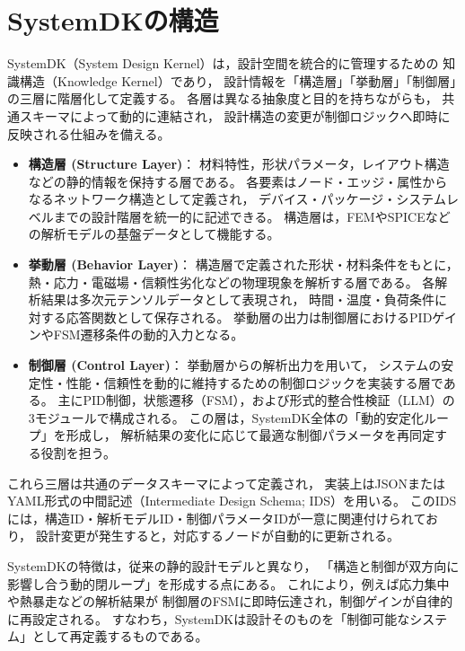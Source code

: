 \section{SystemDKの構造}

SystemDK（System Design Kernel）は，設計空間を統合的に管理するための
知識構造（Knowledge Kernel）であり，
設計情報を「構造層」「挙動層」「制御層」の三層に階層化して定義する。
各層は異なる抽象度と目的を持ちながらも，
共通スキーマによって動的に連結され，
設計構造の変更が制御ロジックへ即時に反映される仕組みを備える。

\begin{itemize}
  \item \textbf{構造層 (Structure Layer)}：  
  材料特性，形状パラメータ，レイアウト構造などの静的情報を保持する層である。  
  各要素はノード・エッジ・属性からなるネットワーク構造として定義され，
  デバイス・パッケージ・システムレベルまでの設計階層を統一的に記述できる。  
  構造層は，FEMやSPICEなどの解析モデルの基盤データとして機能する。
  
  \item \textbf{挙動層 (Behavior Layer)}：  
  構造層で定義された形状・材料条件をもとに，
  熱・応力・電磁場・信頼性劣化などの物理現象を解析する層である。  
  各解析結果は多次元テンソルデータとして表現され，
  時間・温度・負荷条件に対する応答関数として保存される。  
  挙動層の出力は制御層におけるPIDゲインやFSM遷移条件の動的入力となる。
  
  \item \textbf{制御層 (Control Layer)}：  
  挙動層からの解析出力を用いて，
  システムの安定性・性能・信頼性を動的に維持するための制御ロジックを実装する層である。  
  主にPID制御，状態遷移（FSM），および形式的整合性検証（LLM）の3モジュールで構成される。  
  この層は，SystemDK全体の「動的安定化ループ」を形成し，
  解析結果の変化に応じて最適な制御パラメータを再同定する役割を担う。
\end{itemize}

これら三層は共通のデータスキーマによって定義され，
実装上はJSONまたはYAML形式の中間記述（Intermediate Design Schema; IDS）を用いる。
このIDSには，構造ID・解析モデルID・制御パラメータIDが一意に関連付けられており，
設計変更が発生すると，対応するノードが自動的に更新される。

SystemDKの特徴は，従来の静的設計モデルと異なり，
「構造と制御が双方向に影響し合う動的閉ループ」を形成する点にある。
これにより，例えば応力集中や熱暴走などの解析結果が
制御層のFSMに即時伝達され，制御ゲインが自律的に再設定される。
すなわち，SystemDKは設計そのものを「制御可能なシステム」として再定義するものである。
